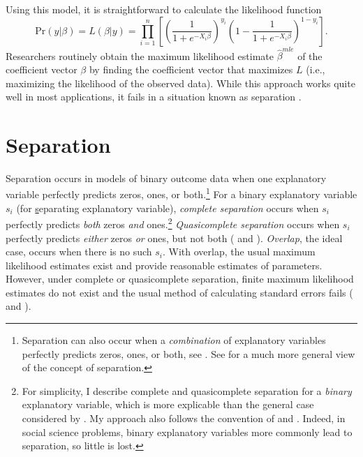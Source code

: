 \documentclass[12pt]{article}
\begin{document}
Using this model, it is straightforward to calculate the likelihood function 
\begin{equation}\nonumber
\text{Pr}(y | \beta) = L(\beta | y) = \displaystyle \prod_{i = 1}^n \left[\left( \dfrac{1}{1 + e^{-X_i\beta}}\right)^{y_i}\left(1 - \dfrac{1}{1 + e^{-X_i\beta}}\right)^{1 - y_i}\right]\text{.}
\end{equation}
Researchers routinely obtain the maximum likelihood estimate $\hat{\beta}^{mle}$ of the coefficient vector $\beta$ by finding the coefficient vector that maximizes $L$ (i.e., maximizing the likelihood of the observed data). 
While this approach works quite well in most applications, it fails in a situation known as separation \citep{Zorn2005}.

\section*{Separation}

Separation occurs in models of binary outcome data when one explanatory variable perfectly predicts zeros, ones, or both.\footnote{
Separation can also occur when a \emph{combination} of explanatory variables perfectly predicts zeros, ones, or both, see \cite{LesaffreAlbert1989}. 
See \cite{Geyer2009} for a much more general view of the concept of separation.} 
For a binary explanatory variable $s_i$ (for \underline{s}eparating explanatory variable), \textit{complete separation} occurs when $s_i$ perfectly predicts \emph{both} zeros \emph{and} ones.\footnote{
For simplicity, I describe complete and quasicomplete separation for a \textit{binary} explanatory variable, which is more explicable than the general case considered by \cite{AlbertAnderson1984}. 
My approach also follows the convention of \cite{HeinzeSchemper2002} and \cite{Zorn2005}. 
Indeed, in social science problems, binary explanatory variables more commonly lead to separation, so little is lost.} 
\textit{Quasicomplete separation} occurs when $s_i$ perfectly predicts \emph{either} zeros \emph{or} ones, but not both (\citealt{AlbertAnderson1984} and \citealt{Zorn2005}). 
\textit{Overlap}, the ideal case, occurs when there is no such $s_i$. 
With overlap, the usual maximum likelihood estimates exist and provide reasonable estimates of parameters. 
However, under complete or quasicomplete separation, finite maximum likelihood estimates do not exist and the usual method of calculating standard errors fails (\citealt{AlbertAnderson1984} and \citealt{Zorn2005}).
\end{document}
